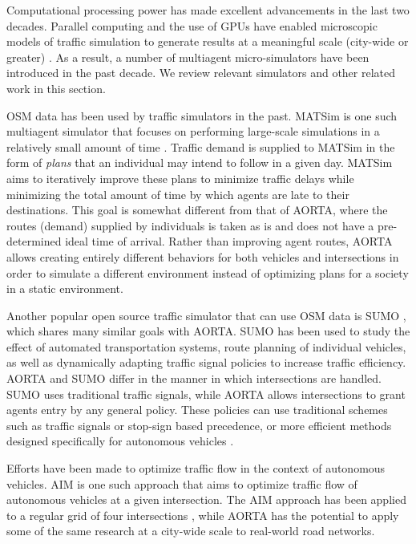 \documentclass[letterpaper, 10 pt, conference]{ieeeconf}  %
\begin{document}

Computational processing power has made excellent advancements in the last two
decades. Parallel computing and the use of GPUs have enabled microscopic models
of traffic simulation to generate results at a meaningful scale (city-wide or
greater) \cite{nagel1994microscopic,shen2011agent}. As a result, a number of
multiagent micro-simulators have been introduced in the past decade. We review
relevant simulators and other related work in this section.

OSM data has been used by traffic simulators in the past. MATSim is one such
multiagent simulator that focuses on performing large-scale simulations in a
relatively small amount of time \cite{balmer2009matsim}. Traffic demand is
supplied to MATSim in the form of \textit{plans} that an individual may intend
to follow in a given day. MATSim aims to iteratively improve these plans to
minimize traffic delays while minimizing the total amount of time by which agents
are late to their destinations. This goal is somewhat different from that of AORTA,
where the routes (demand) supplied by individuals is taken as is and does not have
a pre-determined ideal time of arrival. Rather than improving agent routes, AORTA
allows creating entirely different behaviors for both vehicles and intersections
in order to simulate a different environment instead of optimizing plans for a
society in a static environment.

Another popular open source traffic simulator that can use OSM data is SUMO
\cite{SUMO2011}, which shares many similar goals with AORTA. SUMO has been used to
study the effect of automated transportation systems, route planning of
individual vehicles, as well as dynamically adapting traffic signal policies to
increase traffic efficiency.  AORTA and SUMO differ in the manner in which
intersections are handled. SUMO uses traditional traffic signals, while AORTA
allows intersections to grant agents entry by any general policy. These policies
can use traditional schemes such as traffic signals or stop-sign based
precedence, or more efficient methods designed specifically for autonomous
vehicles \cite{JAIR08-dresner}.

Efforts have been made to optimize traffic flow in the context of autonomous
vehicles. AIM \cite{JAIR08-dresner} is one such approach that aims to optimize
traffic flow of autonomous vehicles at a given intersection. The AIM approach
has been applied to a regular grid of four intersections
\cite{IROS11-hausknecht}, while AORTA has the potential to apply some of the
same research at a city-wide scale to real-world road networks.
\end{document}
